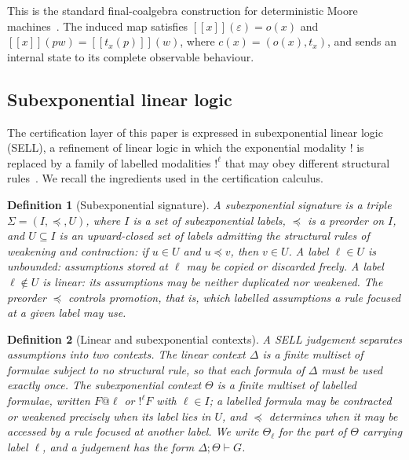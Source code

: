 \documentclass[a4paper,fleqn]{cas-sc}
\newtheorem{definition}{Definition}
\newcommand{\sem}[1]{\left[\!\left[#1\right]\!\right]}
\begin{document}
This is the standard final-coalgebra construction for deterministic Moore
machines~\cite{rutten2000,jacobs2016}. The induced map satisfies
\(\sem{x}(\varepsilon)=o(x)\) and
\(\sem{x}(pw)=\sem{t_x(p)}(w)\), where \(c(x)=(o(x),t_x)\), and sends an
internal state to its complete observable behaviour.

\subsection{Subexponential linear logic}\label{subsec:sell-prelim}

The certification layer of this paper is expressed in subexponential linear logic (SELL), a refinement of linear logic in which the exponential modality \(!\) is replaced by a family of labelled modalities \(!^{\ell}\) that may obey different structural rules~\cite{girard1987,nigam2009,despeyroux2017}. We recall the ingredients used in the certification calculus.

\begin{definition}[Subexponential signature]\label{def:subexp-signature}
A \emph{subexponential signature} is a triple \(\Sigma=(I,\preceq,U)\), where \(I\) is a set of \emph{subexponential labels}, \(\preceq\) is a preorder on \(I\), and \(U\subseteq I\) is an upward-closed set of labels admitting the structural rules of weakening and contraction: if \(u\in U\) and \(u\preceq v\), then \(v\in U\). A label \(\ell\in U\) is \emph{unbounded}: assumptions stored at \(\ell\) may be copied or discarded freely. A label \(\ell\notin U\) is \emph{linear}: its assumptions may be neither duplicated nor weakened. The preorder \(\preceq\) controls promotion, that is, which labelled assumptions a rule focused at a given label may use.
\end{definition}

\begin{definition}[Linear and subexponential contexts]\label{def:contexts}
A SELL judgement separates assumptions into two contexts. The \emph{linear context} \(\Delta\) is a finite multiset of formulae subject to no structural rule, so that each formula of \(\Delta\) must be used exactly once. The \emph{subexponential context} \(\Theta\) is a finite multiset of \emph{labelled} formulae, written \(F@\ell\) or \(!^{\ell}F\) with \(\ell\in I\); a labelled formula may be contracted or weakened precisely when its label lies in \(U\), and \(\preceq\) determines when it may be accessed by a rule focused at another label. We write \(\Theta_{\ell}\) for the part of \(\Theta\) carrying label \(\ell\), and a judgement has the form \(\Delta;\Theta\vdash G\).
\end{definition}
\end{document}
